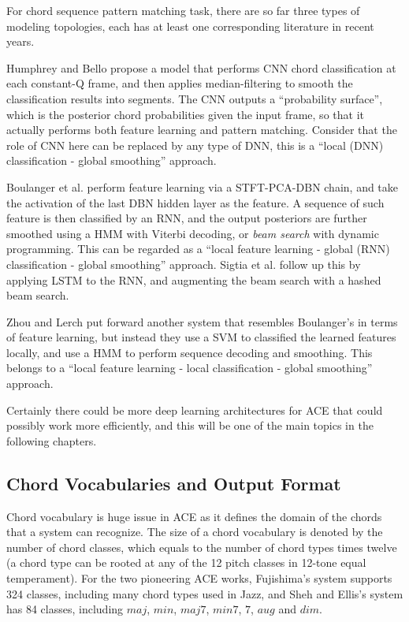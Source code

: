For chord sequence pattern matching task, there are so far three types of modeling topologies, each has at least one corresponding literature in recent years.

Humphrey and Bello \cite{humphrey2012rethinking} propose a model that performs CNN chord classification at each constant-Q frame, and then applies median-filtering to smooth the classification results into segments. The CNN outputs a ``probability surface'', which is the posterior chord probabilities given the input frame, so that it actually performs both feature learning and pattern matching. Consider that the role of CNN here can be replaced by any type of DNN, this is a ``local (DNN) classification - global smoothing'' approach.

Boulanger et al. \cite{boulanger2013audio} perform feature learning via a STFT-PCA-DBN chain, and take the activation of the last DBN hidden layer as the feature. A sequence of such feature is then classified by an RNN, and the output posteriors are further smoothed using a HMM with Viterbi decoding, or {\it beam search} with dynamic programming. This can be regarded as a ``local feature learning - global (RNN) classification - global smoothing'' approach. Sigtia et al. \cite{sigtia2015audio} follow up this by applying LSTM to the RNN, and augmenting the beam search with a hashed beam search.

Zhou and Lerch \cite{zhou2015chord} put forward another system that resembles Boulanger's in terms of feature learning, but instead they use a SVM to classified the learned features locally, and use a HMM to perform sequence decoding and smoothing. This belongs to a ``local feature learning - local classification - global smoothing'' approach.

Certainly there could be more deep learning architectures for ACE that could possibly work more efficiently, and this will be one of the main topics in the following chapters.

\subsection{Chord Vocabularies and Output Format} \label{sec:2-vocab}
Chord vocabulary is huge issue in ACE as it defines the domain of the chords that a system can recognize. The size of a chord vocabulary is denoted by the number of chord classes, which equals to the number of chord types times twelve (a chord type can be rooted at any of the 12 pitch classes in 12-tone equal temperament). For the two pioneering ACE works, Fujishima's system \cite{fujishima1999realtime} supports 324 classes, including many chord types used in Jazz, and Sheh and Ellis's system \cite{sheh2003chord} has 84 classes, including $maj$, $min$, $maj7$, $min7$, $7$, $aug$ and $dim$.

